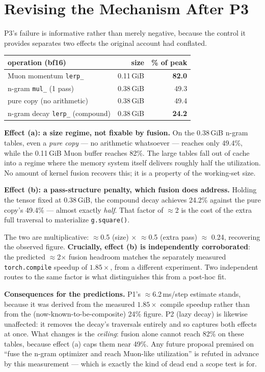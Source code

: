 \documentclass{article}
\begin{document}
\section{Revising the Mechanism After P3}
\label{sec:revised}
P3's failure is informative rather than merely negative, because the control it provides separates two effects the original account had conflated.

\begin{center}\begin{small}
\begin{tabular}{lrr}
\toprule
operation (bf16) & size & \% of peak \\
\midrule
Muon momentum \texttt{lerp\_} & 0.11\,GiB & \textbf{82.0} \\
n-gram \texttt{mul\_} (1 pass) & 0.38\,GiB & 49.3 \\
pure copy (no arithmetic) & 0.38\,GiB & 49.4 \\
n-gram decay \texttt{lerp\_} (compound) & 0.38\,GiB & \textbf{24.2} \\
\bottomrule
\end{tabular}
\end{small}\end{center}

\textbf{Effect (a): a size regime, not fixable by fusion.} On the 0.38\,GiB n-gram tables, even a \emph{pure copy} --- no arithmetic whatsoever --- reaches only 49.4\%, while the 0.11\,GiB Muon buffer reaches 82\%. The large tables fall out of cache into a regime where the memory system itself delivers roughly half the utilization. No amount of kernel fusion recovers this; it is a property of the working-set size.

\textbf{Effect (b): a pass-structure penalty, which fusion does address.} Holding the tensor fixed at 0.38\,GiB, the compound decay achieves 24.2\% against the pure copy's 49.4\% --- almost exactly \emph{half}. That factor of $\approx$2 is the cost of the extra full traversal to materialize \texttt{g.square()}.

The two are multiplicative: $\approx$0.5 (size) $\times$ $\approx$0.5 (extra pass) $\approx$ 0.24, recovering the observed figure. \textbf{Crucially, effect (b) is independently corroborated}: the predicted $\approx$2$\times$ fusion headroom matches the separately measured \texttt{torch.compile} speedup of $1.85\times$, from a different experiment. Two independent routes to the same factor is what distinguishes this from a post-hoc fit.

\textbf{Consequences for the predictions.} P1's $\approx$6.2\,ms/step estimate stands, because it was derived from the measured $1.85\times$ compile speedup rather than from the (now-known-to-be-composite) 24\% figure. P2 (lazy decay) is likewise unaffected: it removes the decay's traversals entirely and so captures both effects at once. What changes is the \emph{ceiling}: fusion alone cannot reach 82\% on these tables, because effect (a) caps them near 49\%. Any future proposal premised on ``fuse the n-gram optimizer and reach Muon-like utilization'' is refuted in advance by this measurement --- which is exactly the kind of dead end a scope test is for.
\end{document}
